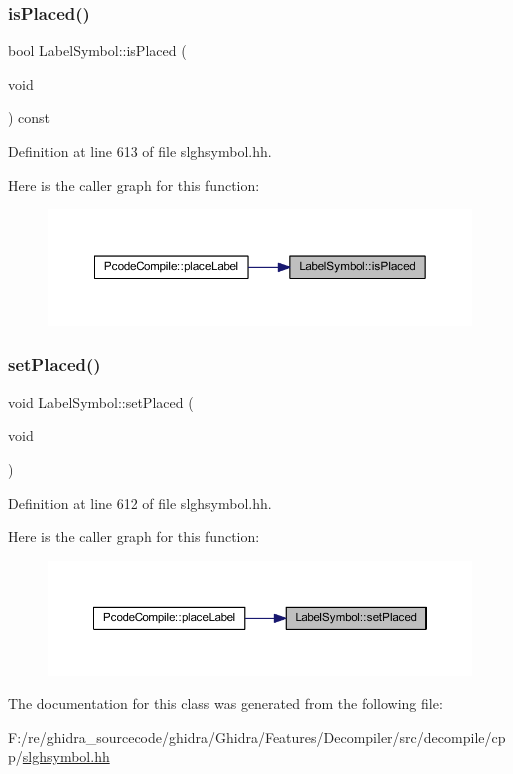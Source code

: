 \subsubsection{\texorpdfstring{isPlaced()}{isPlaced()}}
{\footnotesize\ttfamily bool Label\+Symbol\+::is\+Placed (\begin{DoxyParamCaption}\item[{void}]{ }\end{DoxyParamCaption}) const\hspace{0.3cm}{\ttfamily [inline]}}



Definition at line 613 of file slghsymbol.\+hh.

Here is the caller graph for this function\+:
\nopagebreak
\begin{figure}[H]
\begin{center}
\leavevmode
\includegraphics[width=350pt]{class_label_symbol_a064baae89f74e0b4b3bafa3681fefedc_icgraph}
\end{center}
\end{figure}
\mbox{\label{class_label_symbol_a6be77e18884bf3ea29fb6b214dc5d1e5}} 
\subsubsection{\texorpdfstring{setPlaced()}{setPlaced()}}
{\footnotesize\ttfamily void Label\+Symbol\+::set\+Placed (\begin{DoxyParamCaption}\item[{void}]{ }\end{DoxyParamCaption})\hspace{0.3cm}{\ttfamily [inline]}}



Definition at line 612 of file slghsymbol.\+hh.

Here is the caller graph for this function\+:
\nopagebreak
\begin{figure}[H]
\begin{center}
\leavevmode
\includegraphics[width=350pt]{class_label_symbol_a6be77e18884bf3ea29fb6b214dc5d1e5_icgraph}
\end{center}
\end{figure}


The documentation for this class was generated from the following file\+:\begin{DoxyCompactItemize}
\item 
F\+:/re/ghidra\+\_\+sourcecode/ghidra/\+Ghidra/\+Features/\+Decompiler/src/decompile/cpp/\mbox{\hyperlink{slghsymbol_8hh}{slghsymbol.\+hh}}\end{DoxyCompactItemize}

